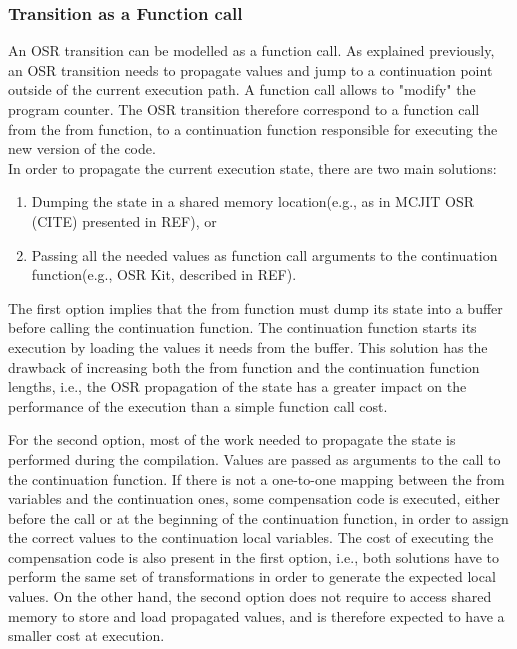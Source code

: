 \subsubsection{Transition as a Function call}
An OSR transition can be modelled as a function call.
As explained previously, an OSR transition needs to propagate values and jump to a continuation point outside of the current execution path.
A function call allows to "modify" the program counter.
The OSR transition therefore correspond to a function call from the from function, to a continuation function responsible for executing the new version of the code.\\

In order to propagate the current execution state, there are two main solutions: 
\begin{enumerate}
    \item Dumping the state in a shared memory location(e.g., as in MCJIT OSR (CITE) presented in REF), or
    \item Passing all the needed values as function call arguments to the continuation function(e.g., OSR Kit, described in REF).
\end{enumerate}

The first option implies that the from function must dump its state into a buffer before calling the continuation function.
The continuation function starts its execution by loading the values it needs from the buffer.
This solution has the drawback of increasing both the from function and the continuation function lengths, i.e., the OSR propagation of the state has a greater impact on the performance of the execution than a simple function call cost.\\


For the second option, most of the work needed to propagate the state is performed during the compilation.
Values are passed as arguments to the call to the continuation function.
If there is not a one-to-one mapping between the from variables and the continuation ones, some compensation code is executed, either before the call or at the beginning of the continuation function, in order to assign the correct values to the continuation local variables.
The cost of executing the compensation code is also present in the first option, i.e., both solutions have to perform the same set of transformations in order to generate the expected local values.
On the other hand, the second option does not require to access shared memory to store and load propagated values, and is therefore expected to have a smaller cost at execution.\\

